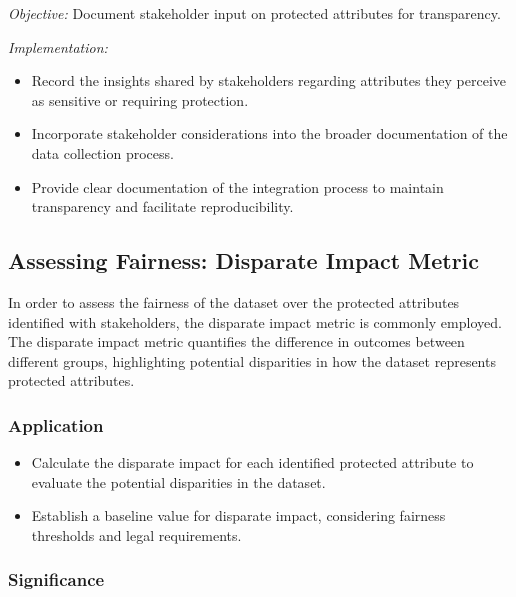 \emph{Objective:} Document stakeholder input on protected attributes for transparency.

\emph{Implementation:}

\begin{itemize}

    \item Record the insights shared by stakeholders regarding attributes they perceive as sensitive or requiring protection.

    \item Incorporate stakeholder considerations into the broader documentation of the data collection process.

    \item Provide clear documentation of the integration process to maintain transparency and facilitate reproducibility.

\end{itemize}

\subsection{Assessing Fairness: Disparate Impact Metric}

In order to assess the fairness of the dataset over the protected attributes identified with stakeholders, the disparate impact metric is commonly employed. The disparate impact metric quantifies the difference in outcomes between different groups, highlighting potential disparities in how the dataset represents protected attributes.

\subsubsection{Application}

\begin{itemize}
    
    \item Calculate the disparate impact for each identified protected attribute to evaluate the potential disparities in the dataset.
    
    \item Establish a baseline value for disparate impact, considering fairness thresholds and legal requirements.

\end{itemize}

\subsubsection{Significance}

